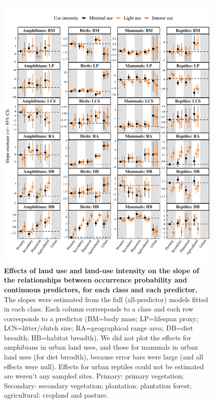 \documentclass[11pt]{article}
\begin{document}
\begin{figure}[h!]
\centering
\includegraphics[scale=0.8]{Figures/Full_LU_models_effects/Slopes_LU}
\caption[]{\textbf{Effects of land use and land-use intensity on the slope of the relationships between occurrence probability and continuous predictors, for each class and each predictor.} The slopes were estimated from the full (all-predictor) models fitted in each class. Each column corresponds to a class and each row corresponds to a predictor (BM=body mass; LP=lifespan proxy; LCS=litter/clutch size; RA=geographical range area; DB=diet breadth; HB=habitat breadth). We did not plot the effects for amphibians in urban land uses, and those for mammals in urban land uses (for diet breadth), because error bars were large (and all effects were null). Effects for urban reptiles could not be estimated are weren't any sampled sites. Primary: primary vegetation; Secondary: secondary vegetation; plantation: plantation forest; agricultural: cropland and pasture.}
\label{}
\end{figure}
\end{document}
